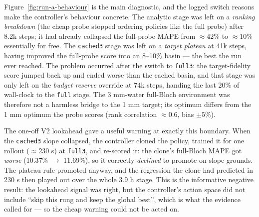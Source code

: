 Figure~\ref{fig:run-a-behaviour} is the main diagnostic, and the logged switch
reasons make the controller's behaviour concrete. The analytic stage was left
on a \emph{ranking breakdown} (the cheap probe stopped ordering policies like
the full probe) after 8.2k steps; it had already collapsed the full-probe MAPE
from ${\approx}42\%$ to ${\approx}10\%$ essentially for free. The
\texttt{cached3} stage was left on a \emph{target plateau} at 41k steps, having
improved the full-probe score into an 8--10\% basin --- the best the run ever
reached. The problem occurred after the switch to \texttt{full3}: the
target-fidelity score jumped back up and ended worse than the cached basin, and
that stage was only left on the \emph{budget reserve} override at 74k steps,
handing the last 20\% of wall-clock to the \texttt{full} stage. The 3 mm-water
full-Bloch environment was therefore not a harmless bridge to the 1 mm target;
its optimum differs from the 1 mm optimum the probe scores (rank correlation
${\approx}0.6$, bias ${\pm}5\%$).

The one-off V2 lookahead gave a useful warning at exactly this boundary. When
the \texttt{cached3} slope collapsed, the controller cloned the policy, trained
it for one rollout (${\approx}230$ s) at \texttt{full3}, and re-scored it: the
clone's full-Bloch MAPE got \emph{worse} (10.37\% $\to$ 11.69\%), so it
correctly \emph{declined} to promote on slope grounds. The plateau rule
promoted anyway, and the regression the clone had predicted in 230 s then
played out over the whole 3.9 h stage. This is the informative negative result:
the lookahead signal was right, but the controller's action space did not
include ``skip this rung and keep the global best'', which is what the evidence
called for --- so the cheap warning could not be acted on.

